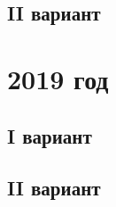 \documentclass[11 pt,russian]{book}
\begin{document}
\subsection{II вариант}
\section{2019 год}
\subsection{I вариант}
\subsection{II вариант}
\end{document}
